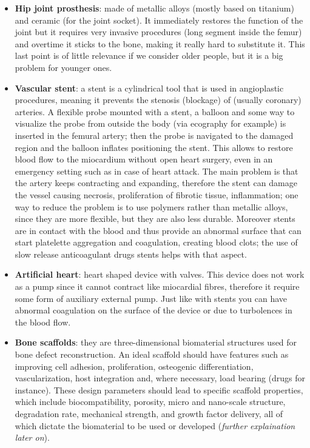   \begin{multicols}{2}
    \begin{itemize}
      \item \textbf{Hip joint prosthesis}: made of metallic alloys (mostly based on titanium) and ceramic (for the joint socket).
        It immediately restores the function of the joint but it requires very invasive procedures (long segment inside the femur) and overtime it sticks to the bone, making it really hard to substitute it.
        This last point is of little relevance if we consider older people, but it is a big problem for younger ones.
      \item \textbf{Vascular stent}: a stent is a cylindrical tool that is used in angioplastic procedures, meaning it prevents the stenosis (blockage) of (usually coronary) arteries.
        A flexible probe mounted with a stent, a balloon and some way to visualize the probe from outside the body (via ecography for example) is inserted in the femural artery; then the probe is navigated to the damaged region and the balloon inflates positioning the stent.
        This allows to restore blood flow to the miocardium without open heart surgery, even in an emergency setting such as in case of heart attack.
        The main problem is that the artery keeps contracting and expanding, therefore the stent can damage the vessel causing necrosis, proliferation of fibrotic tissue, inflammation; one way to reduce the problem is to use polymers rather than metallic alloys, since they are more flexible, but they are also less durable.
        Moreover stents are in contact with the blood and thus provide an abnormal surface that can start platelette aggregation and coagulation, creating blood clots; the use of slow release anticoagulant drugs stents helps with that aspect.
      \item \textbf{Artificial heart}: heart shaped device with valves.
        This device does not work as a pump since it cannot contract like miocardial fibres, therefore it require some form of auxiliary external pump.
        Just like with stents you can have abnormal coagulation on the surface of the device or due to turbolences in the blood flow.
      \item \textbf{Bone scaffolds}: they are three-dimensional biomaterial structures used for bone defect reconstruction.
        An ideal scaffold should have features such as improving cell adhesion, proliferation, osteogenic differentiation, vascularization, host integration and, where necessary, load bearing (drugs for instance).
        These design parameters should lead to specific scaffold properties, which include biocompatibility, porosity, micro and nano-scale structure, degradation rate, mechanical strength, and growth factor delivery, all of which dictate the biomaterial to be used or developed (\textit{further explaination later on}).
    \end{itemize}
  \end{multicols}

